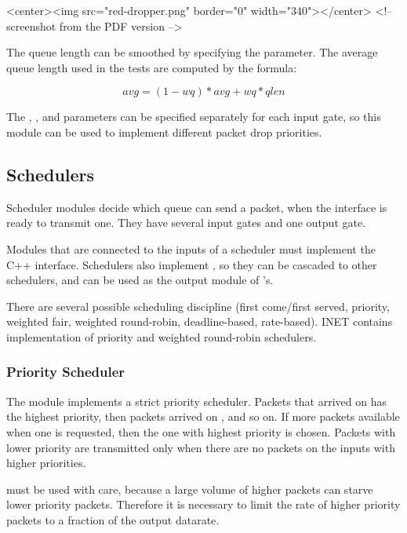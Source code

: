 \begin{htmlonly}
<center><img src="red-dropper.png" border="0" width="340"></center> <!-- screenshot from the PDF version -->
\end{htmlonly}

The queue length can be smoothed by specifying the 
parameter. The average queue length used in the tests
are computed by the formula:

 $$avg = (1-wq)*avg + wq*qlen$$

The , , and  parameters
can be specified separately for each input gate, so this module
can be used to implement different packet drop priorities.

\subsection{Schedulers}
\label{sec:diffserv:schedulers}

Scheduler modules decide which queue can send a packet, when the
interface is ready to transmit one. They have several input gates
and one output gate.

Modules that are connected to the inputs of a scheduler must
implement the  C++ interface.
Schedulers also implement , so
they can be cascaded to other schedulers, and can be used
as the output module of 's.

There are several possible scheduling discipline (first come/first served,
priority, weighted fair, weighted round-robin, deadline-based,
rate-based). INET contains implementation
of priority and weighted round-robin schedulers.

\subsubsection{Priority Scheduler}
\label{sec:diffserv:priority-scheduler}

The  module implements a strict priority
scheduler. Packets that arrived on  has the highest priority,
then packets arrived on , and so on. If more packets
available when one is requested, then the one with highest priority
is chosen. Packets with lower priority are transmitted only when
there are no packets on the inputs with higher priorities.

 must be used with care, because a
large volume of higher packets can starve lower priority packets.
Therefore it is necessary to limit the rate of higher priority
packets to a fraction of the output datarate.

